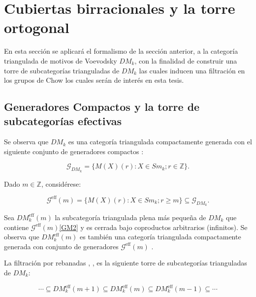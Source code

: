 \documentclass[10pt]{amsart}
\theoremstyle{definition}
\theoremstyle{remark}
\theoremstyle{definition}
\begin{document}
\section{Cubiertas birracionales y la torre ortogonal}
En esta sección se aplicará el formalismo de la sección anterior, a la categoría triangulada de motivos de Voevodsky $DM_{k}$, con la finalidad de construir una torre de subcategorías trianguladas de $DM_{k}$ las cuales inducen una filtración en los grupos de Chow los cuales serán de interés en esta tesis.

\subsection{Generadores Compactos y la torre de subcategorías efectivas}
Se observa que $DM_{k}$ es una categoría triangulada compactamente generada \cite[Def. 1.7]{Nee01} con el siguiente conjunto de generadores compactos \cite[Thm. 4.5.67]{Ayo07}:


\begin{equation}\label{GM}
\mathcal{G}_{DM_{k}}=\{M(X)(r):X\in Sm_{k};r\in\mathbb{Z}\}.
\end{equation}

Dado $m\in\mathbb{Z}$, considérese:

\begin{equation}\label{GM2}
\mathcal{G}^{\textrm{eff}}(m)=\{M(X)(r):X\in Sm_{k};r\geq m\}\subseteq\mathcal {G}_{DM_{k}}.
\end{equation}

Sea $DM^{\textrm{eff}}_{k}(m)$ la subcategoría triangulada plena más pequeña de $DM_{k}$ que contiene $\mathcal{G}^{\textrm{eff}}(m)$\ref{GM2} y es cerrada bajo coproductos arbitrarios (infinitos). Se observa que $DM^{\textrm{eff}}_{k}(m)$ es también una categoría triangulada compactamente generada con conjunto de generadores $\mathcal{G}^{\textrm{eff}}(m)$ \cite[Thm. 2.1(2.1.1)]{Nee96}.

La filtración por rebanadas  \cite{Voe02b}, \cite[p. 18]{Voe10b}, \cite{HK06} es la siguiente torre de subcategorías trianguladas de $DM_{k}$:

\begin{equation}\label{GM3}
\cdots\subseteq DM^{\textrm{eff}}_{k}(m+1)\subseteq DM^{\textrm{eff}}_{k}(m) \subseteq DM^{\textrm{eff}}_{k}(m-1)\subseteq\cdots
\end{equation}                                                                                                                                                                                                                                                                                                                                                                                                                                                                                   
\end{document}
